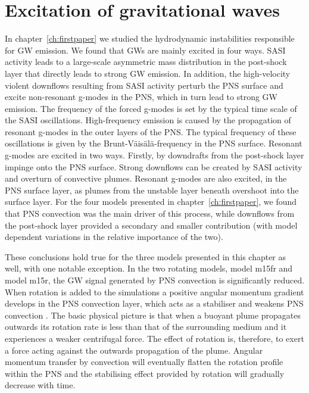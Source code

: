 \section{Excitation of gravitational waves} \label{sec:p2ext}
In chapter~\ref{ch:firstpaper} we studied the hydrodynamic instabilities responsible for GW emission.
We found that GWs are mainly excited in four ways. SASI activity leads to a large-scale asymmetric mass 
distribution in the post-shock layer that directly leads to strong GW emission. In addition, the high-velocity 
violent downflows resulting from SASI activity perturb the PNS surface and excite non-resonant g-modes in the PNS,
which in turn lead to strong GW emission. The frequency of the forced g-modes 
is set by the typical time scale of the SASI oscillations. High-frequency emission is caused by the propagation of
resonant g-modes in the outer layers of the PNS. The typical frequency of these oscillations is given by the
Brunt-V\"{a}is\"{a}l\"{a}-frequency in the PNS surface. Resonant g-modes are excited in two ways.
Firstly, by downdrafts from the post-shock layer impinge onto the PNS surface. Strong downflows can be created by SASI 
activity and overturn of convective plumes. Resonant g-modes are also excited, in the PNS surface layer,
as plumes from the unstable layer beneath overshoot into the surface layer.
For the four models presented in chapter~\ref{ch:firstpaper}, we found that PNS convection was the main driver
of this process, while downflows from the post-shock layer provided a secondary and smaller
contribution (with model dependent variations in the relative importance of the two).

These conclusions hold true for the three models presented in this chapter as well, with one notable
exception. In the two rotating models, model m15fr and model m15r, the GW signal generated by PNS 
convection is significantly reduced. When rotation is added to the simulations a positive
angular momentum gradient develops in the PNS convection layer, which acts as a stabiliser and weakens PNS
convection \citep{janka_01b}. 
The basic physical picture is that when a buoyant plume propagates outwards its rotation rate
is less than that of the surrounding medium and it experiences a weaker centrifugal force.
The effect of rotation is, therefore, to exert a force acting against the outwards propagation of the plume.
Angular momentum transfer by convection will eventually flatten the rotation profile within the PNS and 
the stabilising effect provided by rotation will gradually decrease with time.

